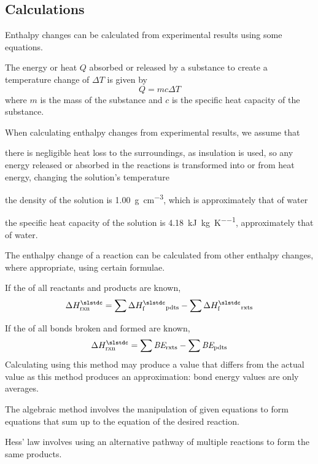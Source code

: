 \documentclass[Chemistry.tex]{subfiles}
\begin{document}
\subsection{Calculations}
Enthalpy changes can be calculated from experimental results using some equations.

The energy or heat \(Q\) absorbed or released by a substance to create a temperature change of \(\Delta T\) is given by \begin{equation}Q = mc\Delta T\end{equation} where \(m\) is the mass of the substance and \(c\) is the specific heat capacity of the substance.

When calculating enthalpy changes from experimental results, we assume that \begin{slinenum}
\item there is negligible heat loss to the surroundings, as insulation is used, so any energy released or absorbed in the reactions is transformed into or from heat energy, changing the solution's temperature
\item the density of the solution is \SI{1.00}{\gram\per\centi\metre\cubed}, which is approximately that of water
\item the specific heat capacity of the solution is \SI{4.18}{\kilo\joule\per\kilogram\per\kelvin}, approximately that of water.
\end{slinenum}

The enthalpy change of a reaction can be calculated from other enthalpy changes, where appropriate, using certain formulae.

If the  of all reactants and products are known, \begin{equation}\sldHs{rxn} = \sum\sldHs{f}_\text{pdts} - \sum\sldHs{f}_\text{rxts}\end{equation}

If the \slBE of all bonds broken and formed are known, \begin{equation}\sldHs{rxn} = \sum\slBE_\text{rxts} - \sum\slBE_\text{pdts}\end{equation} Calculating  using this method may produce a value that differs from the actual value as this method produces an approximation: bond energy values are only averages.

The algebraic method involves the manipulation of given equations to form equations that sum up to the equation of the desired reaction.

Hess' law involves using an alternative pathway of multiple reactions to form the same products.
\end{document}
